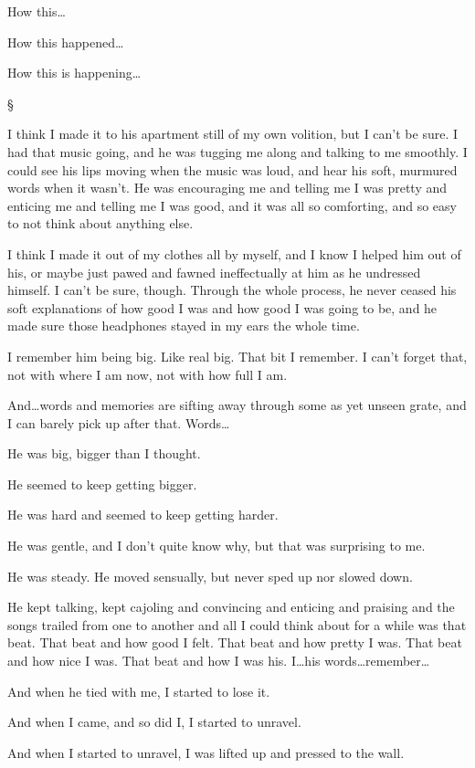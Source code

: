 \documentclass[12pt,letterpaper,oneside]{memoir}
\newcommand\secdiv{
  \begin{center}
    \S
  \end{center}
}
\begin{document}
  How this\ldots{}

  How this happened\ldots{}

  How this is happening\ldots{}

  \secdiv

  I think I made it to his apartment still of my own volition, but I can't be sure. I had that music going, and he was tugging me along and talking to me smoothly. I could see his lips moving when the music was loud, and hear his soft, murmured words when it wasn't. He was encouraging me and telling me I was pretty and enticing me and telling me I was good, and it was all so comforting, and so easy to not think about anything else.

  I think I made it out of my clothes all by myself, and I know I helped him out of his, or maybe just pawed and fawned ineffectually at him as he undressed himself. I can't be sure, though. Through the whole process, he never ceased his soft explanations of how good I was and how good I was going to be, and he made sure those headphones stayed in my ears the whole time.

  I remember him being big. Like real big. That bit I remember. I can't forget that, not with where I am now, not with how full I am.

  And\ldots{}words and memories are sifting away through some as yet unseen grate, and I can barely pick up after that. Words\ldots{}

  He was big, bigger than I thought.

  He seemed to keep getting bigger.

  He was hard and seemed to keep getting harder.

  He was gentle, and I don't quite know why, but that was surprising to me.

  He was steady. He moved sensually, but never sped up nor slowed down.

  He kept talking, kept cajoling and convincing and enticing and praising and the songs trailed from one to another and all I could think about for a while was that beat. That beat and how good I felt. That beat and how pretty I was. That beat and how nice I was. That beat and how I was his. I\ldots{}his words\ldots{}remember\ldots{}

  And when he tied with me, I started to lose it.

  And when I came, and so did I, I started to unravel.

  And when I started to unravel, I was lifted up and pressed to the wall.
\end{document}
